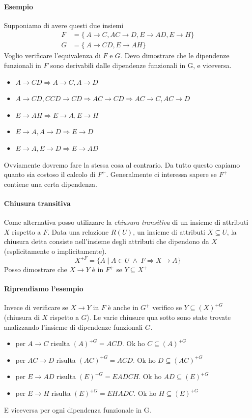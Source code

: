 \paragraph{Esempio} Supponiamo di avere questi due insiemi
\begin{align*}
	F&=\{\ A \to C, AC \to D, E \to AD, E \to H \}\\
	G&=\{\ A \to CD, E \to AH \}
\end{align*}
Voglio verificare l'equivalenza di $F$ e $G$. Devo dimostrare che le dipendenze funzionali in $F$ sono derivabili dalle dipendenze funzionali in G, e viceversa.
\begin{itemize}
	\item $A \to CD \Rightarrow \boxed{A \to C}, A \to D$
	\item $A \to CD, CCD \to CD \Rightarrow AC \to CD \Rightarrow AC \to C, \boxed{AC \to D}$
	\item $E \to AH \Rightarrow E \to A, \boxed{E \to H}$
	\item $E \to A, A \to D \Rightarrow E \to D$
	\item $E \to A , E \to D \Rightarrow \boxed{E \to AD}$
\end{itemize}
Ovviamente dovremo fare la stessa cosa al contrario. Da tutto questo capiamo quanto sia costoso il calcolo di $F^{+}$. Generalmente ci interessa sapere se $F^{+}$ contiene una certa dipendenza.
\paragraph{Chiusura transitiva} Come alternativa posso utilizzare la \emph{chiusura transitiva} di un insieme di attributi $X$ rispetto a $F$. Data una relazione $R(U)$, un insieme di attributi $X \subseteq U$, la chiusura detta consiste nell'insieme degli attributi che dipendono da $X$ (esplicitamente o implicitamente).
\[X^{+F}=\{A \;|\; A \in U\;\land\;F\Longrightarrow X \to A\}\]
Posso dimostrare che $X \to Y$ è in $F^{+}$ se $Y \subseteq X^{+}$
\paragraph{Riprendiamo l'esempio} Invece di verificare se $X \to Y$ in $F$ è anche in $G^{+}$ verifico se $Y \subseteq (X)^{+G}$ (chiusura di $X$ rispetto a $G$). Le varie chiusure qua sotto sono state trovate analizzando l'insieme di dipendenze funzionali $G$.
\begin{itemize}
	\item per $A \to C$ risulta $(A)^{+G}=ACD$. Ok ho $C \subseteq (A)^{+G}$
	\item per $AC \to D$ risulta $(AC)^{+G}=ACD$. Ok ho $D \subseteq (AC)^{+G}$
	\item per $E \to AD$ risulta $(E)^{+G}=EADCH$. Ok ho $AD \subseteq (E)^{+G}$
	\item per $E \to H$ risulta $(E)^{+G}=EHADC$. Ok ho $H \subseteq (E)^{+G}$
\end{itemize}
E viceversa per ogni dipendenza funzionale in G.

